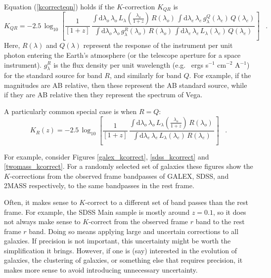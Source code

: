 \documentclass[10pt,preprint]{aastex}
\newcommand{\lambdaobs}{\lambda_o}
\newcommand{\lambdaemit}{\lambda_e}
\renewcommand{\AA}{A}
\begin{document}
Equation (\ref{kcorrecteqn}) holds if the $K$-correction $K_{QR}$ is
\begin{equation}
\label{eq:wavelengthL}
K_{QR} = -2.5\,\log_{10}\left[\frac{1}{[1+z]}\,
  \frac{\displaystyle
  \int\mathrm{d}\lambdaobs\,\lambdaobs\,L_{\lambda}\!\left(\frac{\lambdaobs}{1+z}\right)\,R(\lambdaobs)\,
    \int\mathrm{d}\lambdaemit\,\lambdaemit\,
    g^Q_{\lambda}(\lambdaemit)\,Q(\lambdaemit)}
       {\displaystyle
  \int\mathrm{d}\lambdaobs\,\lambdaobs\,g^R_{\lambda}(\lambdaobs)\,R(\lambdaobs)\,
    \int\mathrm{d}\lambdaemit\,\lambdaemit\,
    L_{\lambda}(\lambdaemit)\,Q(\lambdaemit)}
\right] \;\;\;.
\end{equation}
Here, $R(\lambda)$ and $Q(\lambda)$ represent the response of the
instrument per unit photon entering the Earth's atmosphere (or the
telescope aperture for a space instrument).  $g^R_\lambda$ is the flux
density per unit wavelength (e.g.~ ergs s$^{-1}$ cm$^{-2}$ \AA$^{-1}$)
for the standard source for band $R$, and similarly for band $Q$. For
example, if the magnitudes are AB relative, then these represent the
AB standard source, while if they are AB relative then they represent
the spectrum of Vega. 

A particularly common special case is when $R=Q$:
\begin{equation}
\label{eq:specialL}
K_R(z) = -2.5\,\log_{10}\left[\frac{1}{[1+z]}\,
  \frac{\displaystyle
  \int\mathrm{d}\lambdaobs\,\lambdaobs\,L_{\lambda}\!\left(\frac{\lambdaobs}{1+z}\right)\,R(\lambdaobs)\,}
       {\displaystyle
    \int\mathrm{d}\lambdaemit\,\lambdaemit\,
    L_{\lambda}(\lambdaemit)\,R(\lambdaemit)}
\right] \;\;\;.
\end{equation}

For example, consider Figures \ref{galex_kcorrect},
\ref{sdss_kcorrect} and \ref{twomass_kcorrect}. For a randomly
selected set of galaxies these figures show the $K$-corrections from
the observed frame bandpasses of GALEX, SDSS, and 2MASS respectively,
to the same bandpasses in the rest frame.

Often, it makes sense to $K$-correct to a different set of band passes
than the rest frame. For example, the SDSS Main sample is mostly
around $z=0.1$, so it does not always make sense to $K$-correct from
the observed frame $r$ band to the rest frame $r$ band. Doing so means
applying large and uncertain corrections to all galaxies. If precision
is not important, this uncertainty might be worth the simplification
it brings. However, if one is (say) interested in the evolution of
galaxies, the clustering of galaxies, or something else that requires
precision, it makes more sense to avoid introducing unnecessary
uncertainty.
\end{document}
